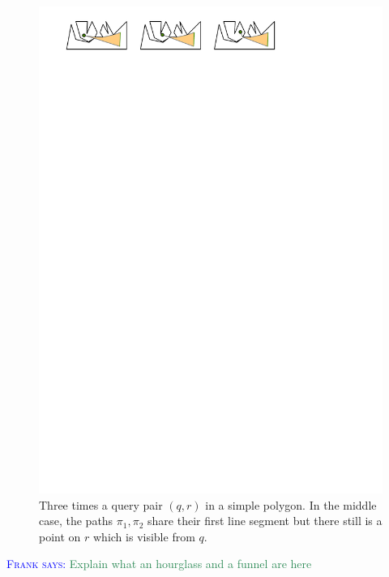\documentclass[UKenglish]{lipics-v2019}
\newcommand{\myremark}[4]{\textcolor{blue}{\textsc{#1 #2:}} \textcolor{#4}{\textsf{#3}}}
\newcommand{\frank}[2][says]{\myremark{Frank}{#1}{#2}{SeaGreen}}
\begin{document}
\begin{figure}[h]
    \centering
    \includegraphics[]{../funnel}
    \caption{Three times a query pair $(q,r)$ in a simple polygon. In the middle case, the paths $\pi_1, \pi_2$ share their first line segment but there still is a point on $r$ which is visible from $q$.}
    \label{fig:funnel}
\end{figure}

\frank{Explain what an hourglass and a funnel are here}
\end{document}
